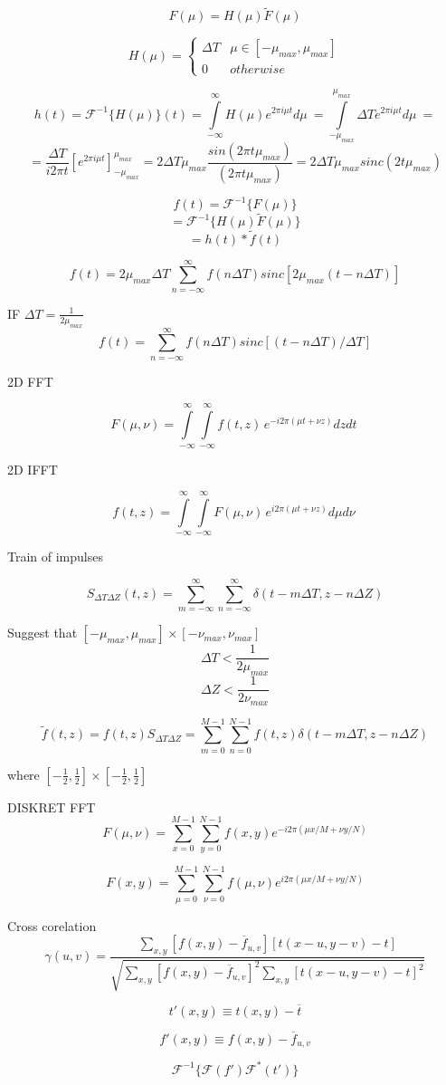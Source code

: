 \documentclass[12pt]{article}
\begin{document}
$$
F(\mu)
=
H(\mu)
\tilde{F}(\mu)
$$

$$
H(\mu)
=
\begin{cases}
\varDelta T & 
\mu \in [-\mu_{max},\mu_{max}] \\
0 & otherwise
\end{cases}
$$

$$
h(t)
=
\mathcal{F}^{-1}\{H(\mu)\}(t)
=
\int\limits_{-\infty}^{\infty}
H(\mu)
e^{2\pi i \mu t }
d\mu~
=
\int\limits_{-\mu_{max}}^{\mu_{max}}
\varDelta T
e^{2\pi i \mu t }
d\mu~
=
$$
$$
=
\frac{\varDelta T}
{i 2 \pi t} 
\left[
e^{	2\pi i \mu t }
\right]_{-\mu_{max}}^{\mu_{max}}
=
2\varDelta T \mu_{max}
\frac{sin(2\pi t \mu_{max}) }{(2\pi t \mu_{max})}
=
2\varDelta T \mu_{max}
sinc(2t\mu_{max})
$$

$$
f(t)
=
\mathcal{F}^{-1}
\{ F(\mu) \}
$$
$$
=
\mathcal{F}^{-1}
\{
H(\mu)\tilde{F}(\mu)
\}
$$
$$
=
h(t)*\tilde{f}(t)
$$

$$
f(t) 
=
2  \mu_{max} \varDelta T
\sum_{ n = - \infty}^{\infty}
f(n \varDelta T ) 
sinc[ 2  \mu_{max}  (t - n \varDelta T) 	]  
$$

IF $   \varDelta T = \frac{1}{2 \mu_{max}}$
$$
f(t) 
=
\sum_{ n = - \infty}^{\infty}
f(n \varDelta T ) 
sinc[ (t - n \varDelta T) / \varDelta T	]  
$$

2D FFT

$$
F(\mu,\nu)
=
\int\limits_{-\infty}^{\infty}
\int\limits_{-\infty}^{\infty}
f(t,z) \,
e^{-i 2 \pi( \mu t + \nu z)}
dz dt~
$$

2D IFFT

$$
f(t,z)
=
\int\limits_{-\infty}^{\infty}
\int\limits_{-\infty}^{\infty}
F(\mu,\nu) \,
e^{i 2 \pi( \mu t + \nu z)}
d\mu d\nu~
$$

Train of impulses

$$
S_{ \varDelta T \varDelta Z }
(t,z)
=
\sum_
{ m = - \infty}^{\infty}
\sum_
{ n = - \infty}^{\infty}
\delta(
t - m \varDelta T,
z - n \varDelta Z
)
$$

Suggest that $
[- \mu_{max},\mu_{max}] 
\times
[- \nu_{max},\nu_{max}] 
$
$$
\varDelta T 
<
\frac{1}{2 \mu_{max}}
$$
$$
\varDelta Z 
<
\frac{1}{2 \nu_{max}}
$$

$$
\tilde{f}(t,z) 
=
f(t,z)
S_{ \varDelta T \varDelta Z }
=
\sum_
{ m =  0}^{M-1}
\sum_
{ n =  0}^{N-1}
f(t,z)\delta(
t - m \varDelta T,
z - n \varDelta Z
)
$$

where 
$
[-\frac{1}{2},
\frac{1}{2}]
\times
[-\frac{1}{2},
\frac{1}{2}]
$

DISKRET FFT
$$
F(\mu,\nu)
=
\sum_
{ x =  0}^{M-1}
\sum_
{ y =  0}^{N-1}
f(x,y)
e^{
-i2\pi(\mu x / M +
 \nu y / N )
}
$$

$$
F(x,y)
=
\sum_
{ \mu =  0}^{M-1}
\sum_
{ \nu =  0}^{N-1}
f(\mu,\nu)
e^{
 i2\pi(\mu x / M +
 \nu y / N )
}
$$

Cross corelation
$$
\gamma(u,v)
=
\frac{
\sum_{x,y}
[f(x,y) - \overline{f}_{u,v}]
[t(x-u,y-v)-t]
}
{
\sqrt{
\sum_{x,y}
[f(x,y) - \overline{f}_{u,v}]^2
\sum_{x,y}
[t(x-u,y-v)-t]^2
}
} 
$$


$$
t'(x,y)
\equiv
t(x,y) - \overline{t}
$$

$$
f'(x,y)
\equiv
f(x,y) - \overline{f}_{u,v}
$$

$$
\mathcal{F}^{-1}
\{
\mathcal{F}(f')
\mathcal{F}^*(t')
\}
$$
\end{document}

